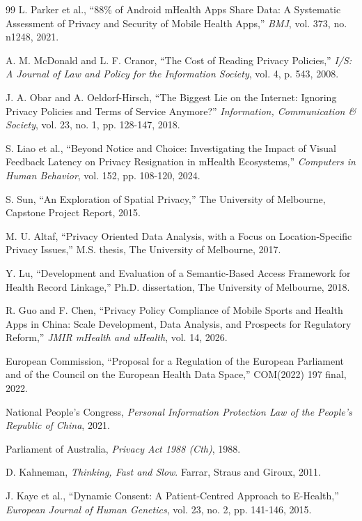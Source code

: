 \documentclass{article}
\begin{document}
\begin{thebibliography}{99}
 L. Parker et al., ``88\% of Android mHealth Apps Share Data: A Systematic Assessment of Privacy and Security of Mobile Health Apps,'' \emph{BMJ}, vol. 373, no. n1248, 2021.

 A. M. McDonald and L. F. Cranor, ``The Cost of Reading Privacy Policies,'' \emph{I/S: A Journal of Law and Policy for the Information Society}, vol. 4, p. 543, 2008.

 J. A. Obar and A. Oeldorf-Hirsch, ``The Biggest Lie on the Internet: Ignoring Privacy Policies and Terms of Service Anymore?'' \emph{Information, Communication \& Society}, vol. 23, no. 1, pp. 128-147, 2018.

 S. Liao et al., ``Beyond Notice and Choice: Investigating the Impact of Visual Feedback Latency on Privacy Resignation in mHealth Ecosystems,'' \emph{Computers in Human Behavior}, vol. 152, pp. 108-120, 2024.

 S. Sun, ``An Exploration of Spatial Privacy,'' The University of Melbourne, Capstone Project Report, 2015.

 M. U. Altaf, ``Privacy Oriented Data Analysis, with a Focus on Location-Specific Privacy Issues,'' M.S. thesis, The University of Melbourne, 2017.

 Y. Lu, ``Development and Evaluation of a Semantic-Based Access Framework for Health Record Linkage,'' Ph.D. dissertation, The University of Melbourne, 2018.

 R. Guo and F. Chen, ``Privacy Policy Compliance of Mobile Sports and Health Apps in China: Scale Development, Data Analysis, and Prospects for Regulatory Reform,'' \emph{JMIR mHealth and uHealth}, vol. 14, 2026.

 European Commission, ``Proposal for a Regulation of the European Parliament and of the Council on the European Health Data Space,'' COM(2022) 197 final, 2022.

 National People's Congress, \emph{Personal Information Protection Law of the People's Republic of China}, 2021.

 Parliament of Australia, \emph{Privacy Act 1988 (Cth)}, 1988.

 D. Kahneman, \emph{Thinking, Fast and Slow}. Farrar, Straus and Giroux, 2011.

 J. Kaye et al., ``Dynamic Consent: A Patient-Centred Approach to E-Health,'' \emph{European Journal of Human Genetics}, vol. 23, no. 2, pp. 141-146, 2015.


\end{thebibliography}
\end{document}
